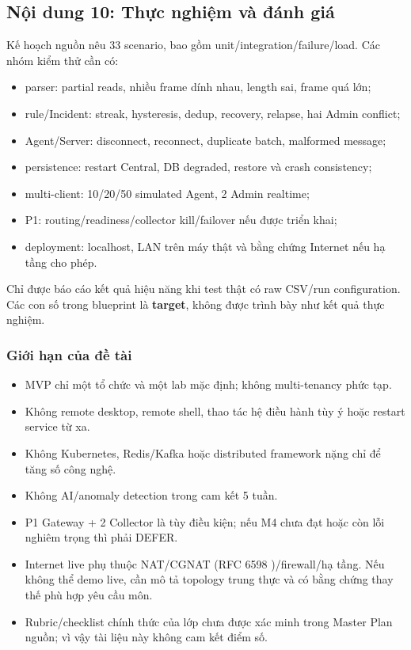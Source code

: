 \subsection{Nội dung 10: Thực nghiệm và đánh giá}

Kế hoạch nguồn nêu 33 scenario, bao gồm unit/integration/failure/load. Các nhóm kiểm thử cần có:
\begin{itemize}
    \item parser: partial reads, nhiều frame dính nhau, length sai, frame quá lớn;
    \item rule/Incident: streak, hysteresis, dedup, recovery, relapse, hai Admin conflict;
    \item Agent/Server: disconnect, reconnect, duplicate batch, malformed message;
    \item persistence: restart Central, DB degraded, restore và crash consistency;
    \item multi-client: 10/20/50 simulated Agent, 2 Admin realtime;
    \item P1: routing/readiness/collector kill/failover nếu được triển khai;
    \item deployment: localhost, LAN trên máy thật và bằng chứng Internet nếu hạ tầng cho phép.
\end{itemize}

Chỉ được báo cáo kết quả hiệu năng khi test thật có raw CSV/run configuration. Các con số trong blueprint là \textbf{target}, không được trình bày như kết quả thực nghiệm.

\subsubsection{Giới hạn của đề tài}

\begin{itemize}
    \item MVP chỉ một tổ chức và một lab mặc định; không multi-tenancy phức tạp.
    \item Không remote desktop, remote shell, thao tác hệ điều hành tùy ý hoặc restart service từ xa.
    \item Không Kubernetes, Redis/Kafka hoặc distributed framework nặng chỉ để tăng số công nghệ.
    \item Không AI/anomaly detection trong cam kết 5 tuần.
    \item P1 Gateway + 2 Collector là tùy điều kiện; nếu M4 chưa đạt hoặc còn lỗi nghiêm trọng thì phải DEFER.
    \item Internet live phụ thuộc NAT/CGNAT (RFC 6598 \cite{rfc6598})/firewall/hạ tầng. Nếu không thể demo live, cần mô tả topology trung thực và có bằng chứng thay thế phù hợp yêu cầu môn.
    \item Rubric/checklist chính thức của lớp chưa được xác minh trong Master Plan nguồn; vì vậy tài liệu này không cam kết điểm số.
\end{itemize}

